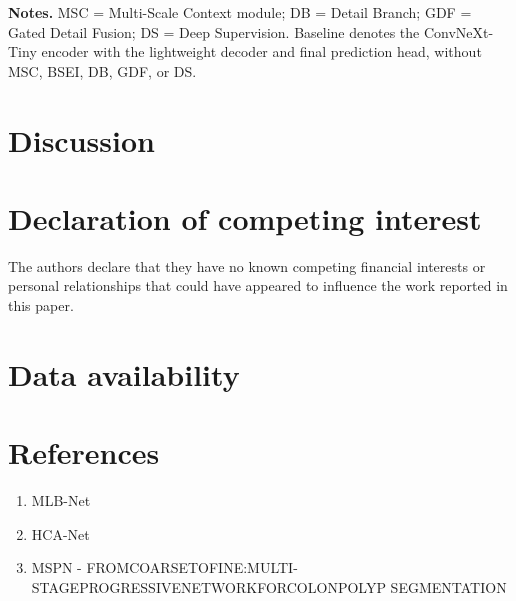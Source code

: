 \textbf{Notes.} MSC = Multi-Scale Context module; DB = Detail Branch;
GDF = Gated Detail Fusion; DS = Deep Supervision. Baseline denotes the
ConvNeXt-Tiny encoder with the lightweight decoder and final prediction
head, without MSC, BSEI, DB, GDF, or DS.

\section{Discussion}\label{discussion}

\section*{Declaration of competing
interest}\label{declaration-of-competing-interest}

The authors declare that they have no known competing financial
interests or personal relationships that could have appeared to
influence the work reported in this paper.

\section*{Data availability}\label{data-availability}

\section*{\texorpdfstring{References }{References }}\label{references}

\begin{enumerate}
\def\labelenumi{\arabic{enumi}.}
\item
  MLB-Net
\item
  HCA-Net
\item
  MSPN - FROMCOARSETOFINE:MULTI-STAGEPROGRESSIVENETWORKFORCOLONPOLYP
  SEGMENTATION
\end{enumerate}

